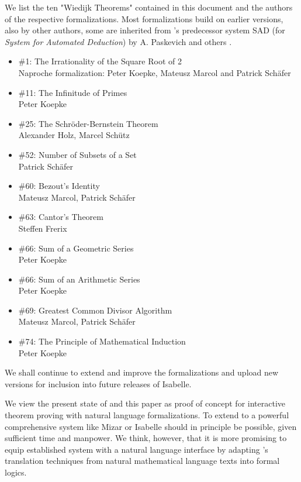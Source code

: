 \documentclass{article}
\begin{document}
We list the ten "Wiedijk Theorems" contained in this document and
the authors of the respective formalizations. Most formalizations build on
earlier versions, also by other authors, some are inherited from
\Naproche's predecessor system
SAD (for \emph{System for Automated Deduction}) by A. Paskevich
and others \cite{SAD}.
\begin{itemize}
\item \#1: The Irrationality of the Square Root of 2\\
Naproche formalization: Peter Koepke, Mateusz Marcol and Patrick Schäfer
\item \#11: The Infinitude of Primes\\
Peter Koepke
\item \#25: The Schröder-Bernstein Theorem\\
Alexander Holz, Marcel Schütz
\item \#52: Number of Subsets of a Set\\
Patrick Schäfer
\item \#60: Bezout's Identity\\
Mateusz Marcol, Patrick Schäfer
\item \#63: Cantor's Theorem\\
Steffen Frerix
\item \#66: Sum of a Geometric Series\\
Peter Koepke
\item \#66: Sum of an Arithmetic Series\\
Peter Koepke
\item \#69: Greatest Common Divisor Algorithm\\
Mateusz Marcol, Patrick Schäfer
\item \#74: The Principle of Mathematical Induction\\
Peter Koepke
\end{itemize}
We shall continue to extend and improve the formalizations and upload
new versions for inclusion into future releases of Isabelle.

We view the present state of \Naproche{} and this paper as proof of
concept for interactive theorem
proving with natural language formalizations.
To extend \Naproche{} to a powerful comprehensive
system like Mizar or Isabelle should in principle be possible,
given sufficient time and manpower.
We think, however, that it is more promising to equip established
system with a natural language interface by adapting
\Naproche's translation techniques
from natural mathematical language texts into formal logics.
\end{document}
